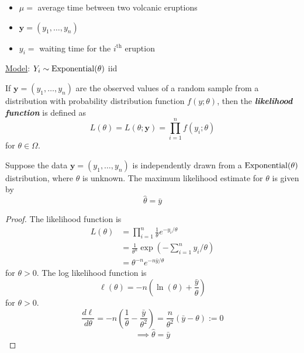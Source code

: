 \begin{exbox}
    \begin{example} $ \; $
        \begin{itemize}
            \item $ \mu= $ average time between two volcanic eruptions
            \item $ \bm{y}=(y_1,\ldots ,y_n) $
            \item $ y_i= $ waiting time for the $ i^{\text{th}} $ eruption
        \end{itemize}
        \underline{Model}: $ Y_i \sim \operatorname{Exponential}(\theta) $ iid
    \end{example}
\end{exbox}

\begin{defbox}
    \begin{definition}
        If $ \bm{y}=(y_1,\ldots ,y_n) $ are the observed values of a random sample from a distribution with
        probability distribution function $ f(y;\theta) $, then the \textbf{\emph{likelihood function}}
        is defined as
        \[ L(\theta)=L(\theta;\bm{y})=\prod_{i=1}^n f(y_i;\theta) \]
        for $ \theta\in\Omega $.
    \end{definition}
\end{defbox}

\begin{thmbox}
    \begin{prop}
        Suppose the data $ \bm{y}=(y_1,\ldots ,y_n) $ is independently
        drawn from a $ \operatorname{Exponential}(\theta) $ distribution, where $ \theta $ is unknown.
        The maximum likelihood estimate for $ \theta $ is given by
        \[ \hat{\theta}=\bar{y} \]
    \end{prop}
\end{thmbox}
\begin{proof}
    The likelihood function is
    \begin{align*}
        L(\theta)
         & =\prod_{i=1}^n \frac{1}{\theta} e^{-y_i/\theta}                        \\
         & =\frac{1}{\theta^n} \exp\left(-\sum\limits_{i=1}^{n} y_i/\theta\right) \\
         & =\theta^{-n}e^{-n\bar{y}/\theta}
    \end{align*}
    for $ \theta>0 $. The log likelihood function is
    \[ \ell(\theta)=-n\left( \ln(\theta)+\frac{\bar{y}}{\theta} \right) \]
    for $ \theta>0 $.
    \[ \frac{d\ell}{d\theta} =-n\left( \frac{1}{\theta} -\frac{\bar{y}}{\theta^2} \right)=
        \frac{n}{\theta^2} \left( \bar{y}-\theta \right):=0 \]
    \[ \implies \hat{\theta}=\bar{y} \]
\end{proof}

